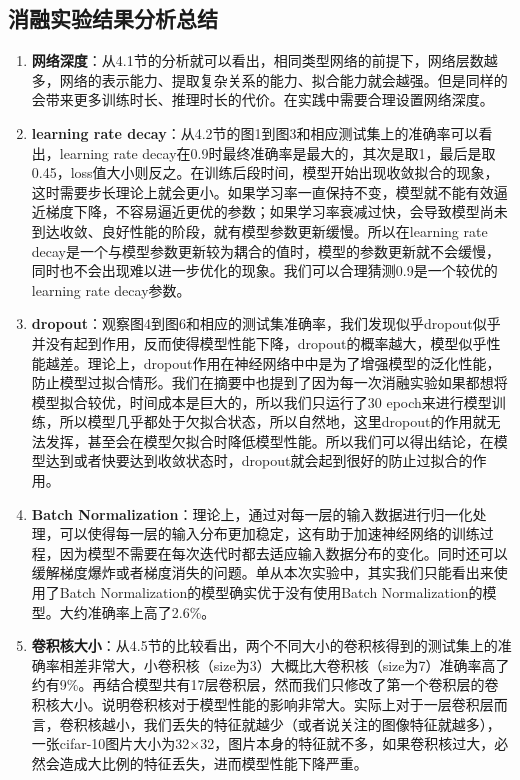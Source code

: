 \documentclass{article}
\begin{document}
\subsection{消融实验结果分析总结}
	\begin{enumerate}[label=\textbullet]
		\item \textbf{网络深度}：从4.1节的分析就可以看出，相同类型网络的前提下，网络层数越多，网络的表示能力、提取复杂关系的能力、拟合能力就会越强。但是同样的会带来更多训练时长、推理时长的代价。在实践中需要合理设置网络深度。
		 \item \textbf{learning rate decay}：从4.2节的图1到图3和相应测试集上的准确率可以看出，learning rate decay在0.9时最终准确率是最大的，其次是取1，最后是取0.45，loss值大小则反之。在训练后段时间，模型开始出现收敛拟合的现象，这时需要步长理论上就会更小。如果学习率一直保持不变，模型就不能有效逼近梯度下降，不容易逼近更优的参数；如果学习率衰减过快，会导致模型尚未到达收敛、良好性能的阶段，就有模型参数更新缓慢。所以在learning rate decay是一个与模型参数更新较为耦合的值时，模型的参数更新就不会缓慢，同时也不会出现难以进一步优化的现象。我们可以合理猜测0.9是一个较优的learning rate decay参数。
		 \item \textbf{dropout}：观察图4到图6和相应的测试集准确率，我们发现似乎dropout似乎并没有起到作用，反而使得模型性能下降，dropout的概率越大，模型似乎性能越差。理论上，dropout作用在神经网络中中是为了增强模型的泛化性能，防止模型过拟合情形。我们在摘要中也提到了因为每一次消融实验如果都想将模型拟合较优，时间成本是巨大的，所以我们只运行了30 epoch来进行模型训练，所以模型几乎都处于欠拟合状态，所以自然地，这里dropout的作用就无法发挥，甚至会在模型欠拟合时降低模型性能。所以我们可以得出结论，在模型达到或者快要达到收敛状态时，dropout就会起到很好的防止过拟合的作用。
		 \item \textbf{Batch Normalization}：理论上，通过对每一层的输入数据进行归一化处理，可以使得每一层的输入分布更加稳定，这有助于加速神经网络的训练过程，因为模型不需要在每次迭代时都去适应输入数据分布的变化。同时还可以缓解梯度爆炸或者梯度消失的问题。单从本次实验中，其实我们只能看出来使用了Batch Normalization的模型确实优于没有使用Batch Normalization的模型。大约准确率上高了2.6\%。
		 \item \textbf{卷积核大小}：从4.5节的比较看出，两个不同大小的卷积核得到的测试集上的准确率相差非常大，小卷积核（size为3）大概比大卷积核（size为7）准确率高了约有9\%。再结合模型共有17层卷积层，然而我们只修改了第一个卷积层的卷积核大小。说明卷积核对于模型性能的影响非常大。实际上对于一层卷积层而言，卷积核越小，我们丢失的特征就越少（或者说关注的图像特征就越多），一张cifar-10图片大小为32×32，图片本身的特征就不多，如果卷积核过大，必然会造成大比例的特征丢失，进而模型性能下降严重。
	\end{enumerate}
	
\end{document}
